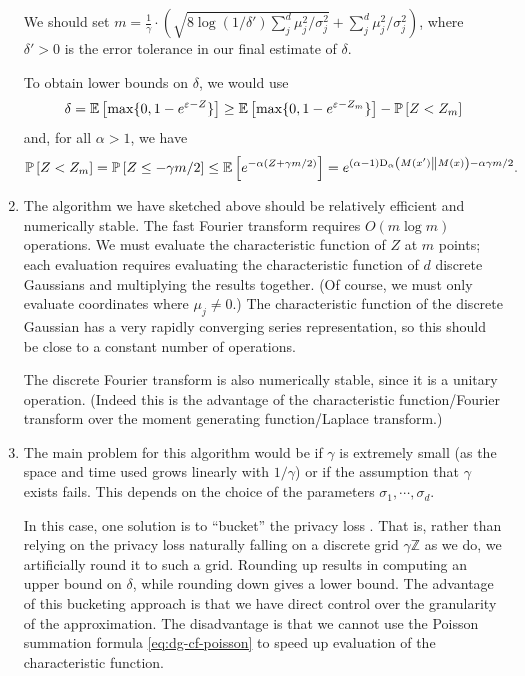 \documentclass{jpc}
\newcommand{\ex}[2]{{\ifx&#1& \mathbb{E} \else
\underset{#1}{\mathbb{E}} \fi \left[#2\right]}}
\newcommand{\pr}[2]{{\ifx&#1& \mathbb{P} \else
\underset{#1}{\mathbb{P}} \fi \left[#2\right]}}
\newcommand{\dr}[3]{\mathrm{D}_{#1}\left(#2\middle\|#3\right)}
\newcommand{\eps}{\varepsilon}
\newcommand{\Z}{\mathbb{Z}}
\begin{document}
\begin{enumerate}
    We should set $m=\frac{1}{\gamma} \cdot \left(\sqrt{8 \log(1/\delta') \sum_j^d \mu_j^2/\sigma_j^2} + \sum_j^d \mu_j^2/\sigma_j^2\right)$, where $\delta'>0$ is the error tolerance in our final estimate of $\delta$.
    
    To obtain lower bounds on $\delta$, we would use 
    \begin{equation}
        \delta = \ex{}{\max\{0,1-e^{\eps-Z}\}} \ge \ex{}{\max\{0,1-e^{\eps-Z_m}\}} - \pr{}{Z<Z_m}
    \end{equation} 
    and, for all $\alpha>1$, we have 
    \begin{equation}
        \pr{}{Z<Z_m} = \pr{}{Z \le -\gamma m / 2} \le \ex{}{e^{-\alpha(Z + \gamma m / 2)}} = e^{(\alpha-1)\dr{\alpha}{M(x')}{M(x)} - \alpha\gamma m / 2}.
    \end{equation}
    
    \item The algorithm we have sketched above should be relatively efficient and numerically stable. The fast Fourier transform requires $O(m \log m)$ operations. We must evaluate the characteristic function of $Z$ at $m$ points; each evaluation requires evaluating the characteristic function of $d$ discrete Gaussians and multiplying the results together. (Of course, we must only evaluate coordinates where $\mu_j \ne 0$.) The characteristic function of the discrete Gaussian has a very rapidly converging series representation, so this should be close to a constant number of operations.
    
    The discrete Fourier transform is also numerically stable, since it is a unitary operation. (Indeed this is the advantage of the characteristic function/Fourier transform over the moment generating function/Laplace transform.)
    
    \item The main problem for this algorithm would be if $\gamma$ is extremely small (as the space and time used grows linearly with $1/\gamma$) or if the assumption that $\gamma$ exists fails. This depends on the choice of the parameters $\sigma_1, \cdots, \sigma_d$.
    
    In this case, one solution is to ``bucket'' the privacy loss \citep{KoskelaJPH20,GoogleComposition}. That is, rather than relying on the privacy loss naturally falling on a discrete grid $\gamma \Z$ as we do, we artificially round it to such a grid. Rounding up results in computing an upper bound on $\delta$, while rounding down gives a lower bound. The advantage of this bucketing approach is that we have direct control over the granularity of the approximation. The disadvantage is that we cannot use the Poisson summation formula \eqref{eq:dg-cf-poisson} to speed up evaluation of the characteristic function.
    
 \end{enumerate}
\end{document}

